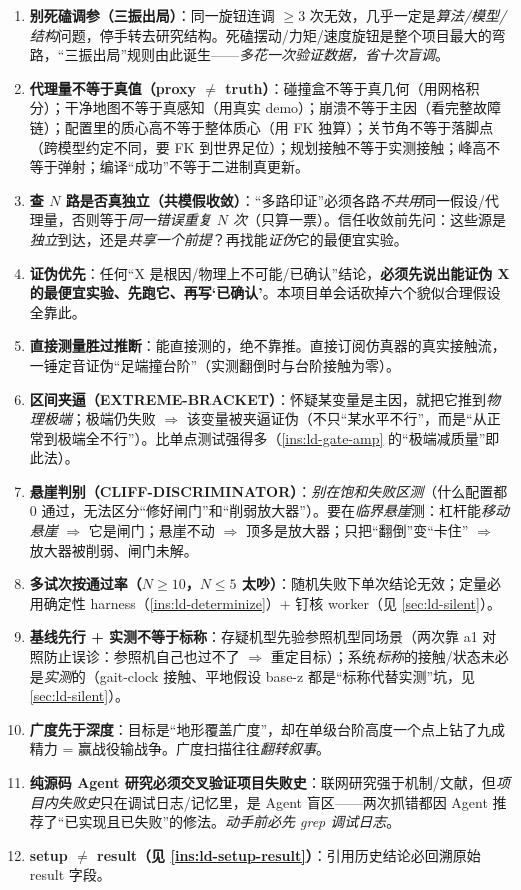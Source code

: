 \begin{enumerate}
  \item \textbf{别死磕调参（三振出局）}：同一旋钮连调 $\ge 3$ 次无效，几乎一定是\emph{算法/模型/结构}问题，停手转去研究结构。死磕摆动/力矩/速度旋钮是整个项目最大的弯路，“三振出局”规则由此诞生——\emph{多花一次验证数据，省十次盲调}。
  \item \textbf{代理量不等于真值（proxy $\ne$ truth）}：碰撞盒不等于真几何（用网格积分）；干净地图不等于真感知（用真实 demo）；崩溃不等于主因（看完整故障链）；配置里的质心高不等于整体质心（用 FK 独算）；关节角不等于落脚点（跨模型约定不同，要 FK 到世界足位）；规划接触不等于实测接触；峰高不等于弹射；编译“成功”不等于二进制真更新。
  \item \textbf{查 $N$ 路是否真独立（共模假收敛）}：“多路印证”必须各路\emph{不共用}同一假设/代理量，否则等于\emph{同一错误重复 $N$ 次}（只算一票）。信任收敛前先问：这些源是\emph{独立}到达，还是\emph{共享一个前提}？再找能\emph{证伪}它的最便宜实验。
  \item \textbf{证伪优先}：任何“X 是根因/物理上不可能/已确认”结论，\textbf{必须先说出能证伪 X 的最便宜实验、先跑它、再写‘已确认’}。本项目单会话砍掉六个貌似合理假设全靠此。
  \item \textbf{直接测量胜过推断}：能直接测的，绝不靠推。直接订阅仿真器的真实接触流，一锤定音证伪“足端撞台阶”（实测翻倒时与台阶接触为零）。
  \item \textbf{区间夹逼（EXTREME-BRACKET）}：怀疑某变量是主因，就把它推到\emph{物理极端}；极端仍失败 $\Rightarrow$ 该变量被夹逼证伪（不只“某水平不行”，而是“从正常到极端全不行”）。比单点测试强得多（\cref{ins:ld-gate-amp} 的“极端减质量”即此法）。
  \item \textbf{悬崖判别（CLIFF-DISCRIMINATOR）}：\emph{别在饱和失败区测}（什么配置都 $0$ 通过，无法区分“修好闸门”和“削弱放大器”）。要在\emph{临界悬崖}测：杠杆能\emph{移动悬崖} $\Rightarrow$ 它是闸门；悬崖不动 $\Rightarrow$ 顶多是放大器；只把“翻倒”变“卡住” $\Rightarrow$ 放大器被削弱、闸门未解。
  \item \textbf{多试次按通过率（$N\ge 10$，$N\le 5$ 太吵）}：随机失败下单次结论无效；定量必用确定性 harness（\cref{ins:ld-determinize}）+ 钉核 worker（见 \cref{sec:ld-silent}）。
  \item \textbf{基线先行 + 实测不等于标称}：存疑机型先验参照机型同场景（两次靠 a1 对照防止误诊：参照机自己也过不了 $\Rightarrow$ 重定目标）；系统\emph{标称}的接触/状态未必是\emph{实测}的（gait-clock 接触、平地假设 base-z 都是“标称代替实测”坑，见 \cref{sec:ld-silent}）。
  \item \textbf{广度先于深度}：目标是“地形覆盖广度”，却在单级台阶高度一个点上钻了九成精力 = 赢战役输战争。广度扫描往往\emph{翻转叙事}。
  \item \textbf{纯源码 Agent 研究必须交叉验证项目失败史}：联网研究强于机制/文献，但\emph{项目内失败史}只在调试日志/记忆里，是 Agent 盲区——两次抓错都因 Agent 推荐了“已实现且已失败”的修法。\emph{动手前必先 grep 调试日志}。
  \item \textbf{setup $\ne$ result（见 \cref{ins:ld-setup-result}）}：引用历史结论必回溯原始 result 字段。
\end{enumerate}

